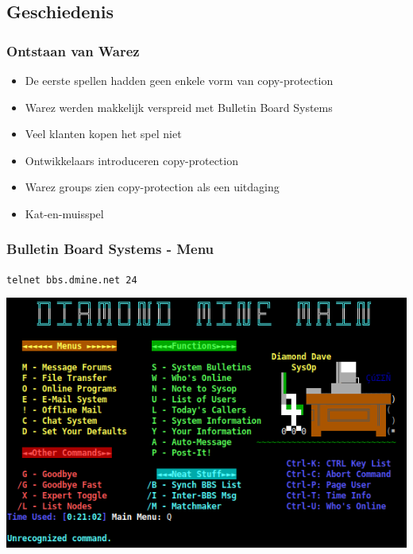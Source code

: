 \documentclass{beamer}
\begin{document}
%

\subsection{Geschiedenis}

\begin{frame}
	\frametitle{Ontstaan van Warez}

	\begin{itemize}
		\item De eerste spellen hadden geen enkele vorm van copy-protection
		\item Warez werden makkelijk verspreid met Bulletin Board Systems
		\item Veel klanten kopen het spel niet
		\item Ontwikkelaars introduceren copy-protection
		\item Warez groups zien copy-protection als een uitdaging
		\item Kat-en-muisspel
	\end{itemize}
\end{frame}

\begin{frame}
	\frametitle{Bulletin Board Systems - Menu}

	\texttt{telnet bbs.dmine.net 24}

	\begin{center}
	\includegraphics[width=\textwidth]{warez_menu.png}
	\end{center}
\end{frame}
\end{document}

